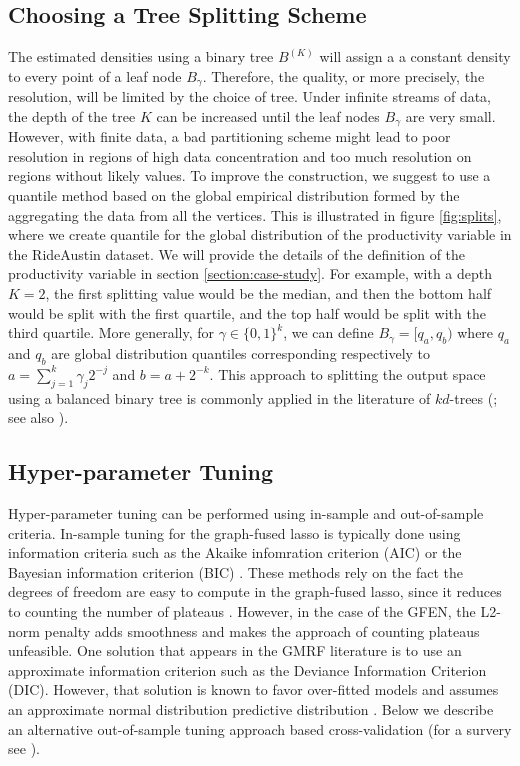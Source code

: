 \documentclass[a4paper, 11pt]{article}
\begin{document}
 
\subsection{Choosing a Tree Splitting Scheme}

The estimated densities using a binary tree $B^{(K)}$ will assign a a constant density to every point of a leaf node $B_\gamma$. Therefore, the quality, or more precisely, the resolution, will be limited by the choice of tree. Under infinite streams of data, the depth of the tree $K$ can be increased until the leaf nodes $B_\gamma$ are very small. However, with finite data, a bad partitioning scheme might lead to poor resolution in regions of high data concentration and too much resolution on regions without likely values. To improve the construction, we suggest to use a quantile method based on the global empirical distribution formed by the aggregating the data from all the vertices. This is illustrated in figure \ref{fig:splits}, where we create quantile for the global distribution of the productivity variable in the RideAustin dataset. We will provide the details of the definition of the productivity variable in section \ref{section:case-study}. For example, with a depth $K=2$, the first splitting value would be the median, and then the bottom half would be split with the first quartile, and the top half would be split with the third quartile. More generally, for $\gamma \in \{0,1\}^k$, we can define $B_\gamma = [q_a, q_b)$ where $q_a$ and $q_b$ are global distribution quantiles corresponding respectively to $a=\sum_{j=1}^k \gamma_j 2^{-j}$ and $b=a + 2^{-k}$. This approach to splitting the output space using a balanced binary tree is commonly applied in the literature of $kd$-trees (\citet{bentley1975multidimensional}; see also \citet{brown2015building}).



\subsection{Hyper-parameter Tuning}\label{sec:hyper}

Hyper-parameter tuning can be performed using in-sample and out-of-sample criteria.
In-sample tuning for the graph-fused lasso is typically done using information criteria such as the Akaike infomration criterion (AIC) or the Bayesian information criterion (BIC) \citep{tibshirani-2015}. These methods rely on the fact the degrees of freedom are easy to compute in the graph-fused lasso, since it reduces to counting the number of plateaus \citep{tansey-scott-2015}. However, in the case of the GFEN, the L2-norm penalty adds smoothness and makes the approach of counting plateaus unfeasible. One solution that appears in the GMRF literature is to use an approximate information criterion such as the Deviance Information Criterion (DIC). However, that solution is known to favor over-fitted models and assumes an approximate normal distribution predictive distribution \citep{ando2011predictive}. Below we describe an alternative out-of-sample tuning approach based cross-validation (for a survery see \citet{arlot2010survey}).
\end{document}
